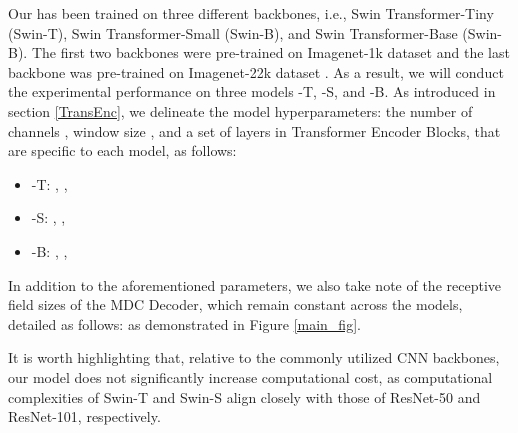 \documentclass[journal]{IEEEtran}
\begin{document}
Our \model has been trained on three different backbones, i.e., Swin Transformer-Tiny (Swin-T), Swin Transformer-Small (Swin-B), and Swin Transformer-Base (Swin-B). The first two backbones were pre-trained on Imagenet-1k dataset \cite{deng2009imagenet} and the last backbone was pre-trained on Imagenet-22k dataset \cite{deng2009imagenet}. As a result, we will conduct the experimental performance on three models \model-T, \model-S, and \model-B. As introduced in section \ref{TransEnc}, we delineate the model hyperparameters: 
the number of channels ,
window size , and
a set of layers  in Transformer Encoder Blocks, that are specific to each model, as follows:

\begin{itemize}
    \item \model-T: , ,  \item \model-S: , ,  \item \model-B: , ,  \end{itemize}

In addition to the aforementioned parameters, we also take note of the receptive field sizes of the MDC Decoder, which remain constant across the models, detailed as follows:  as demonstrated in Figure \ref{main_fig}.

It is worth highlighting that, relative to the commonly utilized CNN backbones, our model does not significantly increase computational cost, as computational complexities of Swin-T and Swin-S align closely with those of ResNet-50 and ResNet-101, respectively.




\newcommand{\lovedaResults}[8]{#1& #2& #3& #4& #5& #6& #7& #8}
\end{document}

